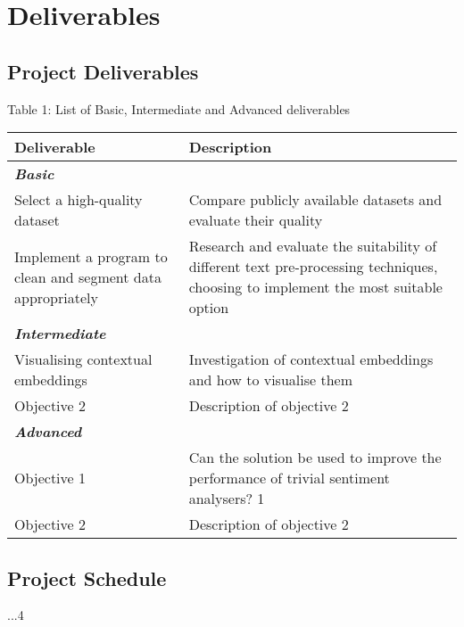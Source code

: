 \documentclass[12pt,a4paper]{article}
\begin{document}
\newpage

\section{Deliverables}
\subsection{Project Deliverables}
\begin{center}
	Table 1: List of Basic, Intermediate and Advanced deliverables
\end{center}
\begin{tabular}{p{5cm}p{10cm}}
	\hline
	\textbf{Deliverable} & \textbf{Description}\\
	\hline\hline
	\multicolumn{2}{l}{\textit{\textbf{Basic}}} \\
	\hline
	Select a high-quality dataset   &  Compare publicly available datasets and evaluate their quality\\
	
	Implement a program to clean and segment data appropriately   & Research and evaluate the suitability of different text pre-processing techniques, choosing to implement the most suitable option\\
	\hline \hline
	\multicolumn{2}{l}{\textit{\textbf{Intermediate}}} \\
	\hline
	Visualising contextual embeddings   & Investigation of contextual embeddings and how to visualise them\\
	Objective 2   &  Description of objective 2\\
	\hline \hline
	\multicolumn{2}{l}{\textit{\textbf{Advanced}}} \\
	\hline
	Objective 1   &  Can the solution be used to improve the performance of trivial sentiment analysers? 1\\
	Objective 2   &  Description of objective 2\\
	\hline
\end{tabular}

\subsection{Project Schedule}
...4 

\newpage
\end{document}
